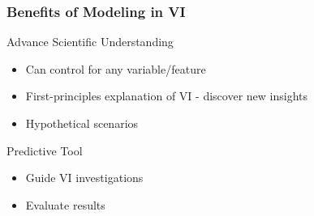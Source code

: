\begin{frame}
  \frametitle{Benefits of Modeling in VI}
  \begin{block}{Advance Scientific Understanding}
    \begin{itemize}
      \item Can control for any variable/feature
      \item First-principles explanation of VI - discover new insights
      \item Hypothetical scenarios
    \end{itemize}
  \end{block}
  \begin{block}{Predictive Tool}
    \begin{itemize}
      \item Guide VI investigations
      \item Evaluate results
    \end{itemize}
  \end{block}
\end{frame}



